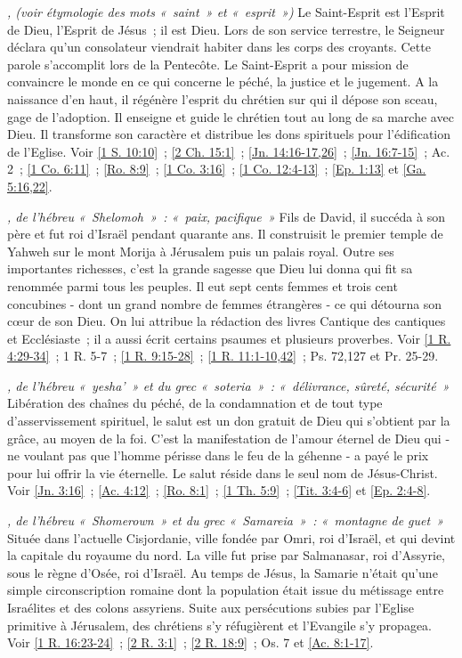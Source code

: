 \begin{multicols}{2}
\textit{, (voir étymologie des mots «~saint~» et «~esprit~»)}\newline
Le Saint-Esprit est l'Esprit de Dieu, l'Esprit de Jésus~; il est Dieu. Lors de son service terrestre, le Seigneur déclara qu'un consolateur viendrait habiter dans les corps des croyants. Cette parole s'accomplit lors de la Pentecôte. Le Saint-Esprit a pour mission de convaincre le monde en ce qui concerne le péché, la justice et le jugement. A la naissance d'en haut, il régénère l'esprit du chrétien sur qui il dépose son sceau, gage de l'adoption. Il enseigne et guide le chrétien tout au long de sa marche avec Dieu. Il transforme son caractère et distribue les dons spirituels pour l'édification de l'Eglise. Voir \vref{1 S. 10:10}~; \vref{2 Ch. 15:1}~; \vref{Jn. 14:16-17,26}~; \vref{Jn. 16:7-15}~; Ac. 2~; \vref{1 Co. 6:11}~; \vref{Ro. 8:9}~; \vref{1 Co. 3:16}~; \vref{1 Co. 12:4-13}~; \vref{Ep. 1:13} et \vref{Ga. 5:16,22}.

\textit{, de l'hébreu «~Shelomoh~»~: «~paix, pacifique~»}\newline
Fils de David, il succéda à son père et fut roi d'Israël pendant quarante ans. Il construisit le premier temple de Yahweh sur le mont Morija à Jérusalem puis un palais royal. Outre ses importantes richesses, c'est la grande sagesse que Dieu lui donna qui fit sa renommée parmi tous les peuples. Il eut sept cents femmes et trois cent concubines - dont un grand nombre de femmes étrangères - ce qui détourna son cœur de son Dieu. On lui attribue la rédaction des livres Cantique des cantiques et Ecclésiaste~; il a aussi écrit certains psaumes et plusieurs proverbes. Voir \vref{1 R. 4:29-34}~; 1 R. 5-7~; \vref{1 R. 9:15-28}~; \vref{1 R. 11:1-10,42}~; Ps. 72,127 et Pr. 25-29.

\textit{, de l'hébreu «~yesha'~» et du grec «~soteria~»~: «~délivrance, sûreté, sécurité~»}\newline
Libération des chaînes du péché, de la condamnation et de tout type d'asservissement spirituel, le salut est un don gratuit de Dieu qui s'obtient par la grâce, au moyen de la foi. C'est la manifestation de l'amour éternel de Dieu qui - ne voulant pas que l'homme périsse dans le feu de la géhenne - a payé le prix pour lui offrir la vie éternelle. Le salut réside dans le seul nom de Jésus-Christ. Voir \vref{Jn. 3:16}~; \vref{Ac. 4:12}~; \vref{Ro. 8:1}~; \vref{1 Th. 5:9}~; \vref{Tit. 3:4-6} et \vref{Ep. 2:4-8}.

\textit{, de l'hébreu «~Shomerown~» et du grec «~Samareia~»~: «~montagne de guet~»}\newline
Située dans l'actuelle Cisjordanie, ville fondée par Omri, roi d'Israël, et qui devint la capitale du royaume du nord. La ville fut prise par Salmanasar, roi d'Assyrie, sous le règne d'Osée, roi d'Israël. Au temps de Jésus, la Samarie n'était qu'une simple circonscription romaine dont la population était issue du métissage entre Israélites et des colons assyriens. Suite aux persécutions subies par l'Eglise primitive à Jérusalem, des chrétiens s'y réfugièrent et l'Evangile s'y propagea. Voir \vref{1 R. 16:23-24}~; \vref{2 R. 3:1}~; \vref{2 R. 18:9}~; Os. 7 et \vref{Ac. 8:1-17}.


\end{multicols}
